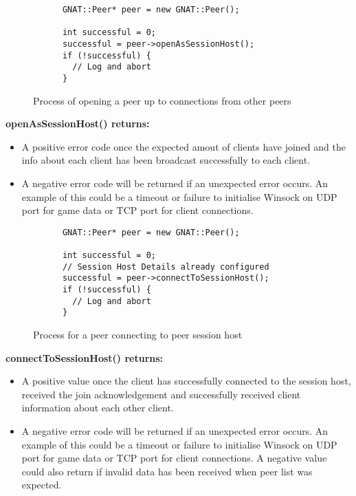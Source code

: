 \begin{figure}[!h]
  \centering
  \begin{lstlisting}
      GNAT::Peer* peer = new GNAT::Peer();

      int successful = 0;
      successful = peer->openAsSessionHost();
      if (!successful) {
        // Log and abort
      }
  \end{lstlisting}
  \caption{Process of opening a peer up to connections from other peers}
  \label{code:peer_conn_host}
\end{figure}
\textbf{openAsSessionHost() returns:}
\begin{itemize}
\item A positive error code once the expected amout of clients have joined and the info about each client has been broadcast successfully to each client.

\item A negative error code will be returned if an unexpected error occurs. An example of this could be a timeout or failure to initialise Winsock on UDP port for game data or TCP port for client connections.
\end{itemize}


\begin{figure}[!h]
  \centering
  \begin{lstlisting}
      GNAT::Peer* peer = new GNAT::Peer();

      int successful = 0;
      // Session Host Details already configured
      successful = peer->connectToSessionHost();
      if (!successful) {
        // Log and abort
      }
  \end{lstlisting}
  \caption{Process for a peer connecting to peer session host}
  \label{code:peer_conn_join}
\end{figure}
\textbf{connectToSessionHost() returns:}
\begin{itemize}
\item A positive value once the client has successfully connected to the session host, received the join acknowledgement and successfully received client information about each other client.

\item A negative error code will be returned if an unexpected error occurs. An example of this could be a timeout or failure to initialise Winsock on UDP port for game data or TCP port for client connections. A negative value could also return if invalid data has been received when peer list was expected.
\end{itemize}
